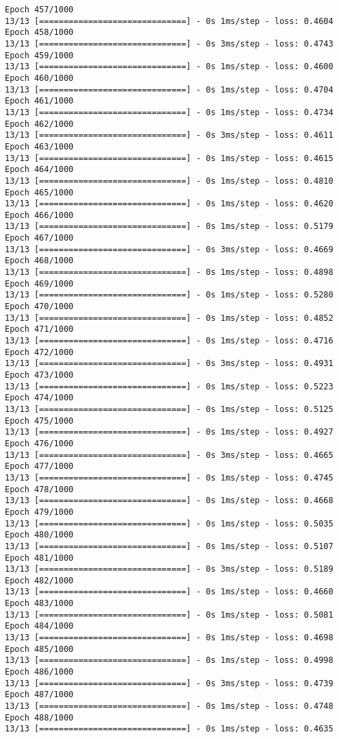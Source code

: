 \documentclass[11pt]{article}
\begin{document}
\begin{Verbatim}[commandchars=\\\{\}]
Epoch 457/1000
13/13 [==============================] - 0s 1ms/step - loss: 0.4604
Epoch 458/1000
13/13 [==============================] - 0s 3ms/step - loss: 0.4743
Epoch 459/1000
13/13 [==============================] - 0s 1ms/step - loss: 0.4600
Epoch 460/1000
13/13 [==============================] - 0s 1ms/step - loss: 0.4704
Epoch 461/1000
13/13 [==============================] - 0s 1ms/step - loss: 0.4734
Epoch 462/1000
13/13 [==============================] - 0s 3ms/step - loss: 0.4611
Epoch 463/1000
13/13 [==============================] - 0s 1ms/step - loss: 0.4615
Epoch 464/1000
13/13 [==============================] - 0s 1ms/step - loss: 0.4810
Epoch 465/1000
13/13 [==============================] - 0s 1ms/step - loss: 0.4620
Epoch 466/1000
13/13 [==============================] - 0s 1ms/step - loss: 0.5179
Epoch 467/1000
13/13 [==============================] - 0s 3ms/step - loss: 0.4669
Epoch 468/1000
13/13 [==============================] - 0s 1ms/step - loss: 0.4898
Epoch 469/1000
13/13 [==============================] - 0s 1ms/step - loss: 0.5280
Epoch 470/1000
13/13 [==============================] - 0s 1ms/step - loss: 0.4852
Epoch 471/1000
13/13 [==============================] - 0s 1ms/step - loss: 0.4716
Epoch 472/1000
13/13 [==============================] - 0s 3ms/step - loss: 0.4931
Epoch 473/1000
13/13 [==============================] - 0s 1ms/step - loss: 0.5223
Epoch 474/1000
13/13 [==============================] - 0s 1ms/step - loss: 0.5125
Epoch 475/1000
13/13 [==============================] - 0s 1ms/step - loss: 0.4927
Epoch 476/1000
13/13 [==============================] - 0s 3ms/step - loss: 0.4665
Epoch 477/1000
13/13 [==============================] - 0s 1ms/step - loss: 0.4745
Epoch 478/1000
13/13 [==============================] - 0s 1ms/step - loss: 0.4668
Epoch 479/1000
13/13 [==============================] - 0s 1ms/step - loss: 0.5035
Epoch 480/1000
13/13 [==============================] - 0s 1ms/step - loss: 0.5107
Epoch 481/1000
13/13 [==============================] - 0s 3ms/step - loss: 0.5189
Epoch 482/1000
13/13 [==============================] - 0s 1ms/step - loss: 0.4660
Epoch 483/1000
13/13 [==============================] - 0s 1ms/step - loss: 0.5081
Epoch 484/1000
13/13 [==============================] - 0s 1ms/step - loss: 0.4698
Epoch 485/1000
13/13 [==============================] - 0s 1ms/step - loss: 0.4998
Epoch 486/1000
13/13 [==============================] - 0s 3ms/step - loss: 0.4739
Epoch 487/1000
13/13 [==============================] - 0s 1ms/step - loss: 0.4748
Epoch 488/1000
13/13 [==============================] - 0s 1ms/step - loss: 0.4635

\end{Verbatim}
\end{document}
